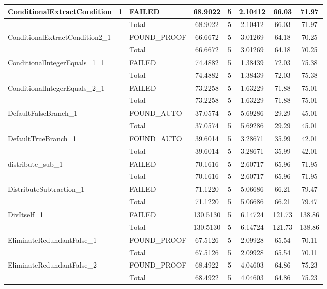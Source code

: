 \begin{appendices}
\begin{longtable}{L{0.25\textwidth} L{0.2\textwidth}  c  c  c  c  c }
    ConditionalExtractCondition\_1 & FAILED & 68.9022 & 5 & 2.10412 & 66.03 & 71.97 \\ \midrule 
    & Total & 68.9022 & 5 & 2.10412 & 66.03 & 71.97 \\ \midrule 
    ConditionalExtractCondition2\_1 & FOUND\_PROOF & 66.6672 & 5 & 3.01269 & 64.18 & 70.25 \\ \midrule 
    & Total & 66.6672 & 5 & 3.01269 & 64.18 & 70.25 \\ \midrule 
    ConditionalIntegerEquals\_1\_1 & FAILED & 74.4882 & 5 & 1.38439 & 72.03 & 75.38 \\ \midrule 
    & Total & 74.4882 & 5 & 1.38439 & 72.03 & 75.38 \\ \midrule 
    ConditionalIntegerEquals\_2\_1 & FAILED & 73.2258 & 5 & 1.63229 & 71.88 & 75.01 \\ \midrule 
    & Total & 73.2258 & 5 & 1.63229 & 71.88 & 75.01 \\ \midrule 
    DefaultFalseBranch\_1 & FOUND\_AUTO & 37.0574 & 5 & 5.69286 & 29.29 & 45.01 \\ \midrule 
    & Total & 37.0574 & 5 & 5.69286 & 29.29 & 45.01 \\ \midrule 
    DefaultTrueBranch\_1 & FOUND\_AUTO & 39.6014 & 5 & 3.28671 & 35.99 & 42.01 \\ \midrule 
    & Total & 39.6014 & 5 & 3.28671 & 35.99 & 42.01 \\ \midrule 
    distribute\_sub\_1 & FAILED & 70.1616 & 5 & 2.60717 & 65.96 & 71.95 \\ \midrule 
    & Total & 70.1616 & 5 & 2.60717 & 65.96 & 71.95 \\ \midrule 
    DistributeSubtraction\_1 & FAILED & 71.1220 & 5 & 5.06686 & 66.21 & 79.47 \\ \midrule 
    & Total & 71.1220 & 5 & 5.06686 & 66.21 & 79.47 \\ \midrule 
    DivItself\_1 & FAILED & 130.5130 & 5 & 6.14724 & 121.73 & 138.86 \\ \midrule 
    & Total & 130.5130 & 5 & 6.14724 & 121.73 & 138.86 \\ \midrule 
    EliminateRedundantFalse\_1 & FOUND\_PROOF & 67.5126 & 5 & 2.09928 & 65.54 & 70.11 \\ \midrule 
    & Total & 67.5126 & 5 & 2.09928 & 65.54 & 70.11 \\ \midrule 
    EliminateRedundantFalse\_2 & FOUND\_PROOF & 68.4922 & 5 & 4.04603 & 64.86 & 75.23 \\ \midrule 
    & Total & 68.4922 & 5 & 4.04603 & 64.86 & 75.23 \\ \midrule 

\end{longtable}
\end{appendices}
